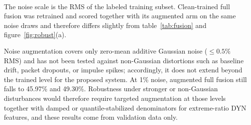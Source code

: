 \documentclass{iopjournal}
\begin{document}
\begin{table}[htbp]
\caption{Validation Macro-F1 (\%) of clean-trained and noise-augmented models under additive Gaussian noise (four seeds). Noise levels are percentages of the valid-observation RMS.}
\label{tab:noiseaug}
\centering
{}\\[2pt]
{\footnotesize The noise scale is the RMS of the labeled training subset. Clean-trained full fusion was retrained and scored together with its augmented arm on the same noise draws and therefore differs slightly from table~\ref{tab:fusion} and figure~\ref{fig:robust}(a).}
\end{table}

Noise augmentation covers only zero-mean additive Gaussian noise ($\le 0.5\%$ RMS) and has not been tested against non-Gaussian distortions such as baseline drift, packet dropouts, or impulse spikes; accordingly, it does not extend beyond the trained level for the proposed system. At 1\% noise, augmented full fusion still falls to 45.97\% and 49.30\%. Robustness under stronger or non-Gaussian disturbances would therefore require targeted augmentation at those levels together with damped or quantile-stabilized denominators for extreme-ratio DYN features, and these results come from validation data only.
\end{document}
